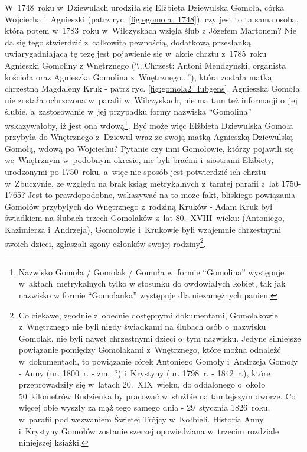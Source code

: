 W~1748~roku w~Dziewulach urodziła się Elżbieta Dziewulska Gomoła, 
córka Wojciecha i~Agnieszki (patrz ryc. \ref{fig:egomola_1748}), czy jest to 
ta sama osoba, która potem w~1783~roku w~Wilczyskach wzięła ślub z Józefem 
Martonem? Nie da się tego stwierdzić z~całkowitą pewnością, dodatkową 
przesłanką uwiarygadniającą tę tezę jest pojawienie się w~akcie chrztu 
z~1785~roku Agnieszki Gomoliny z Wnętrznego (\enquote{...Chrzest: Antoni 
Mendzyński, organista kościoła oraz Agnieszka Gomolina z~Wnętrznego...}), 
która została matką chrzestną Magdaleny Kruk - patrz ryc. 
\ref{fig:gomola2_lubgens}. Agnieszka Gomoła nie została ochrzczona w~parafii 
w~Wilczyskach, nie ma tam też informacji o~jej ślubie, a~zastosowanie w~jej 
przypadku formy nazwiska \enquote{Gomolina} wskazywałoby, iż jest ona 
wdową\footnote{Nazwisko Gomoła / Gomolak / Gomuła w~formie \enquote{Gomolina}
występuje w~aktach~metrykalnych tylko w stosunku do owdowiałych kobiet, tak 
jak nazwisko w formie \enquote{Gomolanka} występuje dla niezamężnych 
panien.}. Być może więc Elżbieta Dziewulska Gomoła przybyła do Wnętrznego 
z~Dziewul wraz ze swoją matką Agnieszką Dziewulską Gomołą, wdową po 
Wojciechu? Pytanie czy inni Gomołowie, którzy pojawili się we~Wnętrznym 
w~podobnym okresie, nie byli braćmi i~siostrami Elżbiety, urodzonymi po 
1750~roku, a~więc nie sposób jest potwierdzić ich chrztu w~Zbuczynie, ze 
względu na brak ksiąg metrykalnych z~tamtej parafii z~lat 1750-1765? Jest to 
prawdopodobne, wskazywać na to może fakt, bliskiego powiązania Gomołów 
przybyłych do Wnętrznego z~rodziną Kruków - Adam Kruk był świadkiem na 
ślubach trzech Gomolaków z~lat 80.~XVIII~wieku: (Antoniego, Kazimierza 
i~Andrzeja), Gomołowie i~Krukowie byli wzajemnie chrzestnymi swoich dzieci, 
zgłaszali zgony członków swojej rodziny\footnote{Co ciekawe, zgodnie 
z~obecnie dostępnymi dokumentami, Gomolakowie z~Wnętrznego nie byli nigdy 
świadkami na ślubach osób o~nazwisku Gomolak, nie byli nawet chrzestnymi 
dzieci o~tym nazwisku. Jedyne silniejsze powiązanie pomiędzy Gomolakami 
z~Wnętrznego, które można odnaleźć w~dokumentach, to powiązanie córek 
Antoniego Gomoły i~Andrzeja Gomoły - Anny (ur. 1800~r. - zm.~?) i~Krystyny 
(ur. 1798~r. - 1842~r.), które przeprowadziły się w~latach 20.~XIX~wieku, do 
oddalonego o~około 50~kilometrów Rudzienka by pracować w~służbie na 
tamtejszym dworze. Co więcej obie wyszły za mąż tego samego dnia - 
29~stycznia 1826~roku, w~parafii pod wezwaniem Świętej Trójcy w~Kołbieli. 
Historia Anny i~Krystyny Gomołów zostanie szerzej opowiedziana w~trzecim 
rozdziale niniejszej książki.}.

